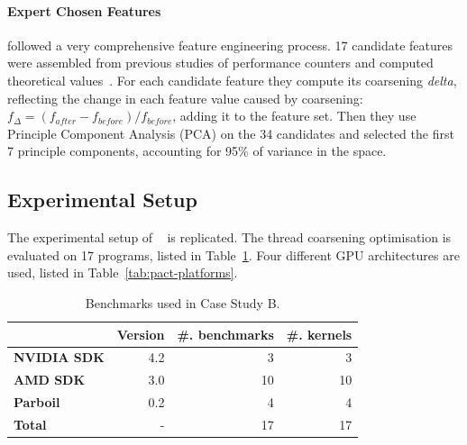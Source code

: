 



\paragraph*{Expert Chosen Features}

\citeauthor{Magni2014}followed a very comprehensive feature engineering process. 17 candidate features were assembled from previous studies of performance counters and computed theoretical values~\cite{Magni2,Sim2012}. For each candidate feature they compute its coarsening \emph{delta}, reflecting the change in each feature value caused by coarsening: $f_{\Delta} = (f_{after} - f_{before}) / f_{before}$, adding it to the feature set. Then they use Principle Component Analysis (PCA) on the 34 candidates and selected the first 7 principle components, accounting for 95\% of variance in the space.

\subsection{Experimental Setup}

The experimental setup of \citeauthor{Magni2014}~\cite{Magni2014} is replicated. The thread coarsening optimisation is evaluated on 17 programs, listed in Table~\ref{tab:pact-benchmarks}. Four different GPU architectures are used, listed in Table~\ref{tab:pact-platforms}.

\begin{table}
	\centering%
	\begin{tabular}{| l r r r |}
		\hline
		\rowcolor{gray!50}
		& \textbf{Version} & \textbf{\#. benchmarks} & \textbf{\#. kernels}\\
		\hline
		\textbf{NVIDIA SDK} & 4.2 & 3 & 3 \\
		\textbf{AMD SDK} & 3.0 & 10 & 10 \\
		\textbf{Parboil~\cite{Stratton2012}} & 0.2 & 4 & 4 \\
		\textbf{Total} & - & 17 & 17 \\
		\hline
	\end{tabular}
	\label{tab:pact-benchmarks}
  \caption[Benchmarks used in Case Study B]{%
	  Benchmarks used in Case Study B.%
  }
\end{table}

